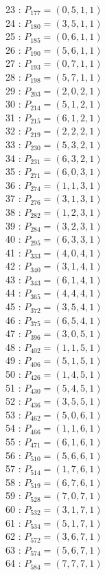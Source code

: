 \documentclass{article}
\begin{document}
{\begin{multicols}{3}
23 : $P_{177}=( 0, 5, 1, 1 )$\\
24 : $P_{180}=( 3, 5, 1, 1 )$\\
25 : $P_{185}=( 0, 6, 1, 1 )$\\
26 : $P_{190}=( 5, 6, 1, 1 )$\\
27 : $P_{193}=( 0, 7, 1, 1 )$\\
28 : $P_{198}=( 5, 7, 1, 1 )$\\
29 : $P_{203}=( 2, 0, 2, 1 )$\\
30 : $P_{214}=( 5, 1, 2, 1 )$\\
31 : $P_{215}=( 6, 1, 2, 1 )$\\
32 : $P_{219}=( 2, 2, 2, 1 )$\\
33 : $P_{230}=( 5, 3, 2, 1 )$\\
34 : $P_{231}=( 6, 3, 2, 1 )$\\
35 : $P_{271}=( 6, 0, 3, 1 )$\\
36 : $P_{274}=( 1, 1, 3, 1 )$\\
37 : $P_{276}=( 3, 1, 3, 1 )$\\
38 : $P_{282}=( 1, 2, 3, 1 )$\\
39 : $P_{284}=( 3, 2, 3, 1 )$\\
40 : $P_{295}=( 6, 3, 3, 1 )$\\
41 : $P_{333}=( 4, 0, 4, 1 )$\\
42 : $P_{340}=( 3, 1, 4, 1 )$\\
43 : $P_{343}=( 6, 1, 4, 1 )$\\
44 : $P_{365}=( 4, 4, 4, 1 )$\\
45 : $P_{372}=( 3, 5, 4, 1 )$\\
46 : $P_{375}=( 6, 5, 4, 1 )$\\
47 : $P_{396}=( 3, 0, 5, 1 )$\\
48 : $P_{402}=( 1, 1, 5, 1 )$\\
49 : $P_{406}=( 5, 1, 5, 1 )$\\
50 : $P_{426}=( 1, 4, 5, 1 )$\\
51 : $P_{430}=( 5, 4, 5, 1 )$\\
52 : $P_{436}=( 3, 5, 5, 1 )$\\
53 : $P_{462}=( 5, 0, 6, 1 )$\\
54 : $P_{466}=( 1, 1, 6, 1 )$\\
55 : $P_{471}=( 6, 1, 6, 1 )$\\
56 : $P_{510}=( 5, 6, 6, 1 )$\\
57 : $P_{514}=( 1, 7, 6, 1 )$\\
58 : $P_{519}=( 6, 7, 6, 1 )$\\
59 : $P_{528}=( 7, 0, 7, 1 )$\\
60 : $P_{532}=( 3, 1, 7, 1 )$\\
61 : $P_{534}=( 5, 1, 7, 1 )$\\
62 : $P_{572}=( 3, 6, 7, 1 )$\\
63 : $P_{574}=( 5, 6, 7, 1 )$\\
64 : $P_{584}=( 7, 7, 7, 1 )$\\
\end{multicols}


}
\end{document}
